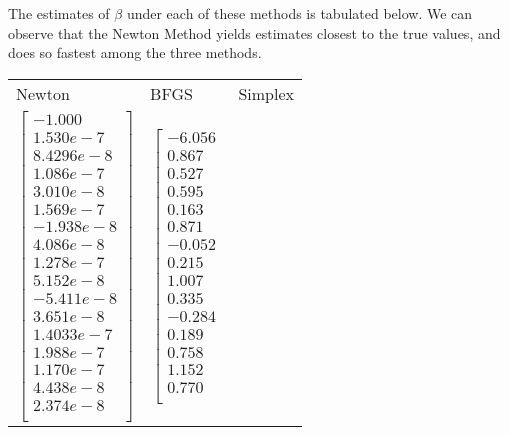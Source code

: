 \documentclass[landscape]{article} %
\theoremstyle{definition}
\begin{document}
\begin{enumerate}
		The estimates of $ \beta $ under each of these methods is tabulated below. We can observe that the Newton Method yields estimates closest to the true values, and does so fastest among the three methods.
		
		\begin{tabular}{p{10em }p{10em } p{10em}} 
			\hline
			 Newton& BFGS& Simplex \\
			 \begin{equation*}
			 	\left[
			 	\begin{array}{c}
			 		-1.000 \\
			 		1.530e-7 \\
			 		8.4296e-8 \\
			 		1.086e-7 \\
			 		3.010e-8 \\
			 		1.569e-7 \\
			 		-1.938e-8 \\
			 		4.086e-8 \\
			 		1.278e-7 \\
			 		5.152e-8 \\
			 		-5.411e-8 \\
			 		3.651e-8 \\
			 		1.4033e-7 \\
			 		1.988e-7 \\
			 		1.170e-7 \\
			 		4.438e-8 \\
			 		2.374e-8 \\
			 	\end{array}
			 	\right]
			 \end{equation*} & 
		 	\begin{equation*}
		 		\left[
		 		\begin{array}{c}
		 			-6.056 \\
		 			0.867 \\
		 			0.527 \\
		 			0.595 \\
		 			0.163 \\
		 			0.871 \\
		 			-0.052 \\
		 			0.215 \\
		 			1.007 \\
		 			0.335 \\
		 			-0.284 \\
		 			0.189 \\
		 			0.758 \\
		 			1.152 \\
		 			0.770 \\

\end{array}
\end{equation*}
\end{tabular}
\end{enumerate}
\end{document}
